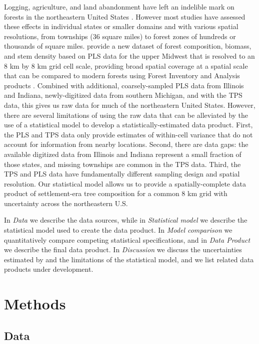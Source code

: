 \documentclass[10pt,letterpaper]{article}
\begin{document}
Logging, agriculture, and land abandonment have left an indelible
mark on forests in the northeastern United States \cite{foster1998land,rhemtulla2009legacies,thompson2013four,goring2015composition}.
However most studies have assessed these effects in individual states
or smaller domains \cite{friedman2005regional,rhemtulla2009historical}
and with various spatial resolutions, from townships (36 square miles)
to forest zones of hundreds or thousands of square miles. \cite{goring2015composition}
provide a new dataset of forest composition, biomass, and stem density
based on PLS data for the upper Midwest that is resolved to an 8 km
by 8 km grid cell scale, providing broad spatial coverage at a spatial
scale that can be compared to modern forests using Forest Inventory
and Analysis products \cite{gray2012forest}. Combined with additional,
coarsely-sampled PLS data from Illinois and Indiana, newly-digitized
data from southern Michigan, and with the TPS data, this gives us
raw data for much of the northeastern United States. However, there
are several limitations of using the raw data that can be alleviated
by the use of a statistical model to develop a statistically-estimated
data product. First, the PLS and TPS data only provide estimates of
within-cell variance that do not account for information from nearby
locations. Second, there are data gaps: the available digitized data
from Illinois and Indiana represent a small fraction of those states,
and missing townships are common in the TPS data. Third, the TPS and
PLS data have fundamentally different sampling design and spatial
resolution. Our statistical model allows us to provide a spatially-complete
data product of settlement-era tree composition for a common 8 km
grid with uncertainty across the northeastern U.S.

In \emph{Data} we describe the data sources, while in \emph{Statistical model} we describe 
the statistical model used to create the data product. In \emph{Model comparison}
 we quantitatively compare competing
statistical specifications, and in \emph{Data Product}
we describe the final data product. In \emph{Discussion}
we discuss the uncertainties estimated by and the
limitations of the statistical model, and we list related data products
under development.

\section*{Methods}

\subsection*{Data\label{sec:Data}}
\end{document}
